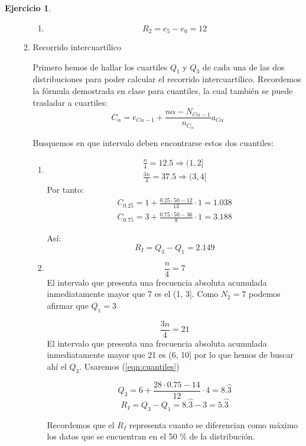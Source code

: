 \documentclass[a4paper, 12pt]{article}
\theoremstyle{definition}
\newtheorem{ej}{Ejercicio}
\begin{document}
\begin{ej}
\begin{enumerate}[label=\textit{\alph*)}]
\begin{enumerate}[label=\arabic*)]
\begin{enumerate}[label=(\arabic*)]
        \item
        \[
        R_2 = e_5 - e_0 = 12
        \]
    \end{enumerate}
    
    \item Recorrido intercuartílico
    
    Primero hemos de hallar los cuartiles \(Q_1\) y \(Q_3\) de cada una de las dos distribuciones para poder calcular el recorrido intercuartílico. Recordemos la fórmula demostrada en clase para cuantiles, la cual también se puede trasladar a cuartiles:
    \begin{equation}\label{eqn:cuantiles}
        C_\alpha = e_{C\alpha - 1} + \frac{n\alpha - N_{C\alpha - 1}}{n_{C_\alpha}}a_{C\alpha}
    \end{equation}
    
    Busquemos en que intervalo deben encontrarse estos dos cuantiles:
    \begin{enumerate}[label=(\arabic*)]
        \item 

    \begin{align*}
    \frac{n}{4} = 12.5 \Rightarrow (1,2] \\
    \frac{3n}{4} = 37.5 \Rightarrow (3,4]
    \end{align*}
    Por tanto:
    \begin{align*}
        C_{0.25} = 1 + \frac{0.25 \cdot 50 - 12}{13} \cdot 1 = 1.038 \\
        C_{0.75} = 3 + \frac{0.75 \cdot 50 - 36}{8} \cdot 1 = 3.188
    \end{align*}
    
    Así:
    \[
    R_I = Q_3 - Q_1 = 2.149
    \]
    
    \item
    
    \[
    \frac{n}{4} = 7
    \]
    El intervalo que presenta una frecuencia absoluta acumulada inmediatamente mayor que 7 es el (1, 3]. Como \(N_2 = 7\) podemos afirmar que \(Q_1 = 3\)
    
    \[
    \frac{3n}{4} = 21
    \]
    El intervalo que presenta una frecuencia absoluta acumulada inmediatamente mayor que 21 es (6, 10] por lo que hemos de buscar ahí el \(Q_3\). Usaremos (\ref{eqn:cuantiles})
    
    \[
    Q_3 = 6 + \frac{28 \cdot 0.75 - 14}{12} \cdot 4 = 8.\wideparen{3}
    \]
    \[
    R_I = Q_3 - Q_1 = 8.\wideparen{3} - 3 = 5.\wideparen{3}
    \]
    
    Recordemos que el \(R_I\) representa cuanto se diferencian como máximo los datos que se encuentran en el 50 \% de la distribución.
    \end{enumerate}
    

\end{enumerate}
\end{enumerate}
\end{ej}
\end{document}
